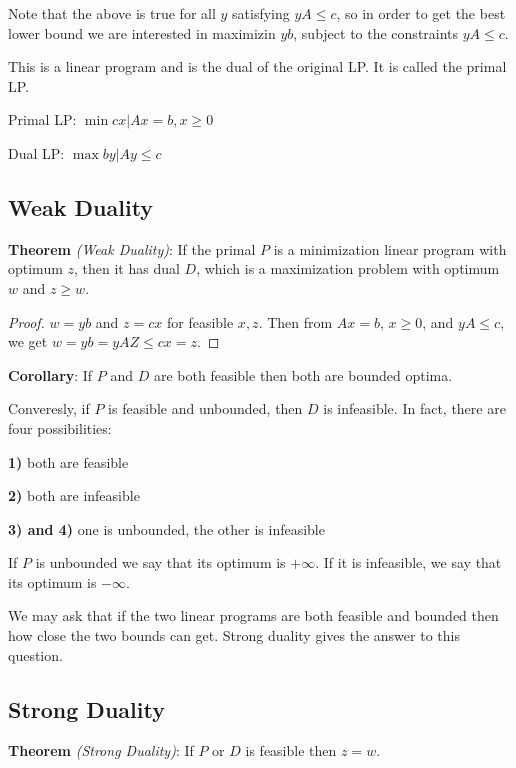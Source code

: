 \documentclass{article}
\begin{document}
Note that the above is true for all $y$  satisfying $yA \le c$, so in order to get the best lower bound we are interested in maximizin $yb$, subject to the constraints $yA \le c$.

This is a linear program and is the dual of the original LP. It is called the primal LP.

Primal LP: $\min cx | Ax =  b, x \ge 0$

Dual LP: $\max by | Ay \le c$

\subsection{Weak Duality}

\textbf{Theorem} \emph{(Weak Duality)}:
If the primal $P$ is a minimization linear program with optimum $z$, then it has dual $D$, which is a maximization problem with optimum $w$ and $z \ge w$.

\begin{proof}
 $w = yb$ and $z=cx$ for feasible $x, z$. Then from $Ax=b$, $x \ge 0$, and $yA \le c$, we get $w=yb=yAZ\le cx=z$.
\end{proof}

\textbf{Corollary}:
If $P$ and $D$ are both feasible then both are bounded optima.

Converesly, if $P$ is feasible and unbounded, then $D$ is infeasible.
In fact, there are four possibilities:

{\bf 1)} both are feasible

{\bf 2)} both are infeasible

{\bf 3) and 4)} one is unbounded, the other is infeasible

If $P$ is unbounded we say that its optimum is $+\infty$. If it is infeasible, we say that its optimum is $-\infty$.

We may ask that if the two linear programs are both feasible and bounded then how close the two bounds can get. Strong duality gives the answer to this question.

\subsection{Strong Duality}

\textbf{Theorem} \emph{(Strong Duality)}:
If $P$ or $D$ is feasible then $z=w$.
\end{document}
